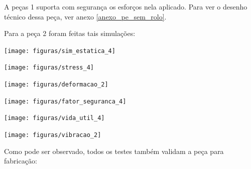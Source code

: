     A peças 1 suporta com segurança os esforços nela aplicado. Para ver o desenho técnico dessa peça, ver anexo \ref{anexo_pe_sem_rolo}.
 
    Para a peça 2 foram feitas tais simulações:
 

    \begin{center}
        \texttt{[image: figuras/sim\_estatica\_4]}
        \label{sim_estatica_4}
    \end{center}
    
    \begin{center}
        \texttt{[image: figuras/stress\_4]}
        \label{stress_4}
    \end{center}
  
    \begin{center}
        \texttt{[image: figuras/deformacao\_2]}
        \label{deformacao_2}
    \end{center}

    \begin{center}
        \texttt{[image: figuras/fator\_seguranca\_4]}
        \label{fator_seguranca_4}
    \end{center}
    
    \begin{center}
        \texttt{[image: figuras/vida\_util\_4]}
        \label{vida_util_4}
    \end{center}

    \begin{center}
        \texttt{[image: figuras/vibracao\_2]}
        \label{vibracao_2}
    \end{center}    

    Como pode ser observado, todos os testes também validam a peça para fabricação:
 
